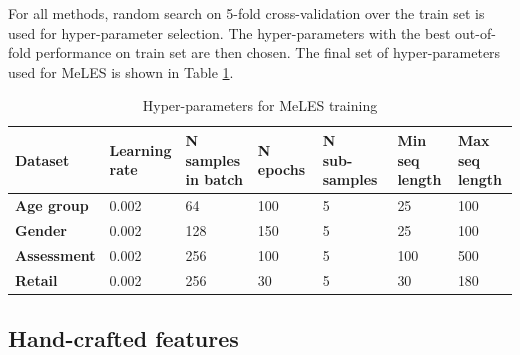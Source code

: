 \documentclass{article}
\begin{document}
For all methods, random search on 5-fold cross-validation over the train set is used for hyper-parameter selection. The hyper-parameters with the best out-of-fold performance on train set are then chosen. The final set of hyper-parameters used for MeLES is shown in Table \ref{tab-hyper}.

\begin{table}
\centering
\caption{Hyper-parameters for MeLES training}
\begin{tabular}{lllllll}
\toprule
\textbf{Dataset} & \makecell[l]{\textbf{Learning} \\ \textbf{rate}} & \makecell[l]{\textbf{N samples} \\ \textbf{in batch}} & \textbf{N epochs} & \makecell[l]{\textbf{N} \\ \textbf{sub-samples}} & \makecell[l]{\textbf{Min seq} \\ \textbf{length}} & \makecell[l]{\textbf{Max seq} \\ \textbf{length}} \\
\midrule
\textbf{Age group} & 0.002 & 64 & 100 & 5 & 25 & 100 \\
\textbf{Gender} & 0.002 & 128 & 150 & 5 & 25 & 100 \\
\textbf{Assessment} & 0.002 & 256 & 100 & 5 & 100 & 500 \\
\textbf{Retail} & 0.002 & 256 & 30 & 5 & 30 & 180 \\
\bottomrule
\end{tabular}
\label{tab-hyper}
\end{table}

\subsection{Hand-crafted features} \label{app-sec-hand}
\end{document}
